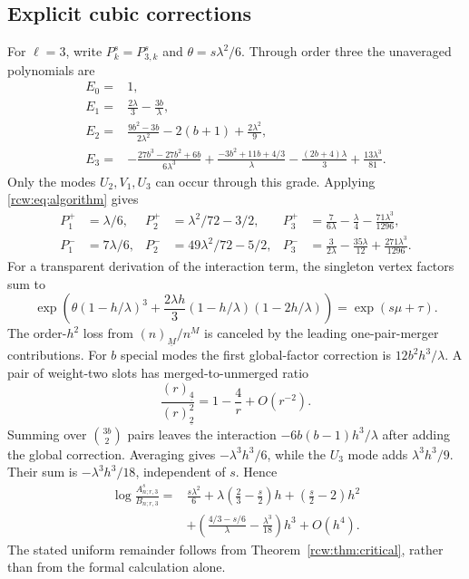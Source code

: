 \documentclass[11pt]{article}
\theoremstyle{definition}\newtheorem{definition}[theorem]{Definition}
\theoremstyle{remark}\newtheorem{remark}[theorem]{Remark}
\newcommand{\fall}[2]{(#1)_{\underline{#2}}}
\numberwithin{equation}{section}
\begin{document}
\subsection{Explicit cubic corrections}
For $\ell=3$, write $P_k^s=P^s_{3,k}$ and $\theta=s\lambda^2/6$. Through order three the unaveraged polynomials are
\begin{align}
 E_0={}&1,\nonumber\\
 E_1={}&\frac{2\lambda}3-\frac{3b}{\lambda},\nonumber\\
 E_2={}&\frac{9b^2-3b}{2\lambda^2}-2(b+1)+\frac{2\lambda^2}9,\label{rcw:eq:cubicE}\\
 E_3={}&-\frac{27b^3-27b^2+6b}{6\lambda^3}
       +\frac{-3b^2+11b+4/3}{\lambda}
       -\frac{(2b+4)\lambda}3+\frac{13\lambda^3}{81}.\nonumber
\end{align}
Only the modes $U_2,V_1,U_3$ can occur through this grade. Applying \eqref{rcw:eq:algorithm} gives
\begin{align}
 P_1^+&=\lambda/6,&
 P_2^+&=\lambda^2/72-3/2,&
 P_3^+&=\frac7{6\lambda}-\frac\lambda4-\frac{71\lambda^3}{1296},\label{rcw:eq:cubicplus}\\
 P_1^-&=7\lambda/6,&
 P_2^-&=49\lambda^2/72-5/2,&
 P_3^-&=\frac3{2\lambda}-\frac{35\lambda}{12}+\frac{271\lambda^3}{1296}.\label{rcw:eq:cubicminus}
\end{align}
For a transparent derivation of the interaction term, the singleton vertex factors sum to
\[
 \exp\left(\theta(1-h/\lambda)^3
       +\frac{2\lambda h}3(1-h/\lambda)(1-2h/\lambda)\right)
 =\exp(s\mu+\tau).
\]
The order-$h^2$ loss from $\fall nM/n^M$ is canceled by the leading one-pair-merger contributions. For $b$ special modes the first global-factor correction is $12b^2h^3/\lambda$. A pair of weight-two slots has merged-to-unmerged ratio
\[
 \frac{\fall r4}{\fall r2^2}=1-\frac4r+O(r^{-2}).
\]
Summing over $\binom{3b}{2}$ pairs leaves the interaction
$-6b(b-1)h^3/\lambda$ after adding the global correction. Averaging gives $-\lambda^3h^3/6$, while the $U_3$ mode adds $\lambda^3h^3/9$. Their sum is $-\lambda^3h^3/18$, independent of $s$. Hence
\begin{align}\label{rcw:eq:criticallog}
 \log\frac{A^s_{n;r,3}}{B_{n;r,3}}
 ={}&\frac{s\lambda^2}6
 +\lambda\left(\frac23-\frac s2\right)h
 +\left(\frac s2-2\right)h^2\nonumber\\
 &+\left(\frac{4/3-s/6}{\lambda}-\frac{\lambda^3}{18}\right)h^3
 +O(h^4).
\end{align}
The stated uniform remainder follows from Theorem~\ref{rcw:thm:critical}, rather than from the formal calculation alone.
\end{document}
